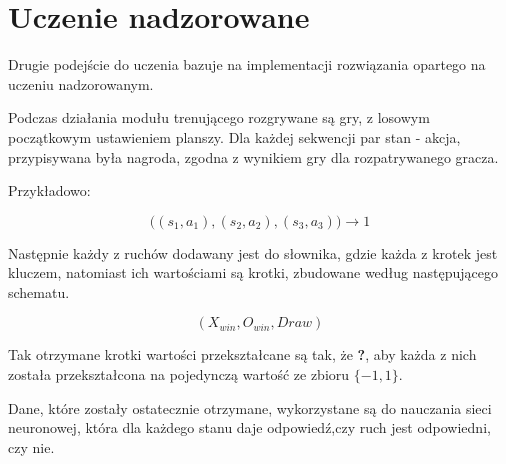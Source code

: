 \section{Uczenie nadzorowane}

Drugie podejście do uczenia bazuje na implementacji rozwiązania opartego na uczeniu nadzorowanym.

Podczas działania modułu trenującego rozgrywane są gry, z losowym początkowym ustawieniem planszy. Dla każdej sekwencji par stan - akcja, przypisywana była nagroda, zgodna z wynikiem gry dla rozpatrywanego gracza.

Przykładowo:

$$\big((s_{1}, a_{1}), (s_{2}, a_{2}), (s_{3}, a_{3})\big) \rightarrow 1$$

Następnie każdy z ruchów dodawany jest do słownika, gdzie każda z krotek jest kluczem, natomiast ich wartościami są krotki, zbudowane według następującego schematu.

$$(X_{win}, O_{win}, Draw)$$

Tak otrzymane krotki wartości przekształcane są tak, że \textbf{?}, aby każda z nich została przekształcona na pojedynczą wartość ze zbioru $\{-1, 1\}$.

Dane, które zostały ostatecznie otrzymane, wykorzystane są do nauczania sieci neuronowej, która dla każdego stanu daje odpowiedź,czy ruch jest odpowiedni, czy nie.

\pagebreak